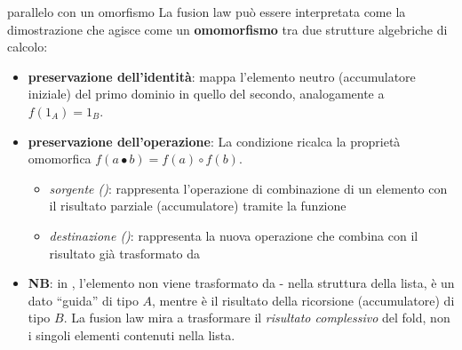 \begin{gframe}{parallelo con un omorfismo}
    La fusion law può essere interpretata come la dimostrazione che  agisce come un \textbf{omomorfismo} tra due strutture algebriche di calcolo:
\begin{itemize}
    \item \textbf{preservazione dell'identità}:  mappa l'elemento neutro (accumulatore iniziale) del primo dominio in quello del secondo, analogamente a $f(1_A) = 1_B$.
    \item \textbf{preservazione dell'operazione}: La condizione  ricalca la proprietà omomorfica $f(a \bullet b) = f(a) \circ f(b)$. 
    \begin{itemize}
        \item \textit{sorgente ()}: rappresenta l'operazione di combinazione di un elemento  con il risultato parziale (accumulatore)  tramite la funzione 
        \item \textit{destinazione ()}: rappresenta la nuova operazione  che combina  con il risultato già trasformato da 
    \end{itemize}
\item \textbf{NB}: in , l'elemento  non viene trasformato da  - nella struttura della lista,  è un dato ``guida'' di tipo $A$, mentre  è il risultato della ricorsione (accumulatore) di tipo $B$. La fusion law mira a trasformare il \textit{risultato complessivo} del fold, non i singoli elementi contenuti nella lista.
\end{itemize}
\end{gframe}

